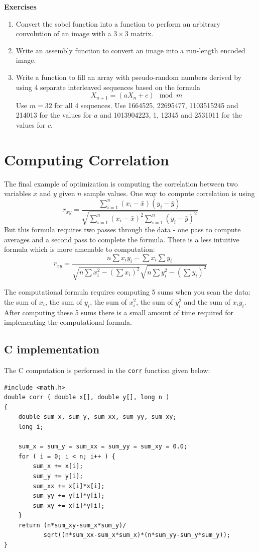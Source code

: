 \documentclass[11pt,b5paper]{book}
\begin{document}
\vfill
\break
{\bf\large Exercises}

\begin{enumerate}
    \item Convert the sobel function into a function to perform an arbitrary
    convolution of an image with a $3\times 3$ matrix.
    \item Write an assembly function to convert an image into a run-length
    encoded image.
    \item Write a function to fill an array with pseudo-random numbers
    derived by using 4 separate interleaved sequences based on
    the formula
    $$X_{n+1} = (a X_n + c) \mod m$$
    Use $m=32$ for all 4 sequences.
    Use 1664525, 22695477, 1103515245 and 214013 for the values for $a$ and
    1013904223, 1, 12345 and 2531011 for the values for $c$.
    
\end{enumerate}

\chapter{Computing Correlation}

The final example of optimization is computing the correlation between two
variables $x$ and $y$ given $n$ sample values.
One way to compute correlation is using
$$r_{xy}= \frac{\sum_{i=1}^n (x_i - \bar{x})(y_i-\bar{y})}
{\sqrt{\sum_{i=1}^n(x_i-\bar{x})^2\sum_{i=1}^n(y_i-\bar{y})^2}} $$
But this formula requires two passes through the data - one pass to compute averages and a second pass to complete the formula.
There is a less intuitive formula which is more amenable to computation:
$$r_{xy} = \frac{n\sum x_iy_i - \sum x_i \sum y_i}
{\sqrt{n\sum x_i^2 - (\sum x_i)^2} \sqrt{n\sum y_i^2 - (\sum y_i)^2} }$$

The computational formula requires computing 5 sums when you scan the data:
the sum of $x_i$, the sum of $y_i$, the sum of $x_i^2$, the sum of $y_i^2$ and
the sum of $x_iy_i$.
After computing these 5 sums there is a small amount of time required for
implementing the computational formula.

\section{C implementation}


The C computation is performed in the {\tt corr} function
given below:

\begin{verbatim}
#include <math.h>
double corr ( double x[], double y[], long n )
{
    double sum_x, sum_y, sum_xx, sum_yy, sum_xy;
    long i;

    sum_x = sum_y = sum_xx = sum_yy = sum_xy = 0.0;
    for ( i = 0; i < n; i++ ) {
        sum_x += x[i];
        sum_y += y[i];
        sum_xx += x[i]*x[i];
        sum_yy += y[i]*y[i];
        sum_xy += x[i]*y[i];
    }
    return (n*sum_xy-sum_x*sum_y)/
           sqrt((n*sum_xx-sum_x*sum_x)*(n*sum_yy-sum_y*sum_y));
}
\end{verbatim}
\end{document}
